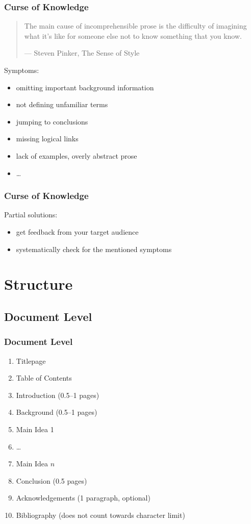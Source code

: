 \begin{frame}
  \frametitle{Curse of Knowledge}

  \begin{quote}
    The main cause of incomprehensible prose is the difficulty of imagining what it's like for someone else not to know something that you know.

    --- Steven Pinker, The Sense of Style
  \end{quote}

  \pause
  \medskip

  Symptoms:
  \begin{itemize}[<+->]
    \item omitting important background information
    \item not defining unfamiliar terms
    \item jumping to conclusions
    \item missing logical links
    \item lack of examples, overly abstract prose
    \item \dots
  \end{itemize}
\end{frame}

\begin{frame}
  \frametitle{Curse of Knowledge}

  Partial solutions:
  \begin{itemize}[<+->]
    \item get feedback from your target audience
    \item systematically check for the mentioned symptoms
  \end{itemize}
\end{frame}

\section{Structure}

\subsection{Document Level}

\begin{frame}
  \frametitle{Document Level}

  \begin{enumerate}
    \item Titlepage
    \item Table of Contents
    \item Introduction (0.5--1 pages)
    \item Background (0.5--1 pages)
    \item Main Idea 1
    \item \dots
    \item Main Idea $n$
    \item Conclusion (0.5 pages)
    \item Acknowledgements (1 paragraph, optional)
    \item Bibliography (does not count towards character limit)
  \end{enumerate}
\end{frame}

